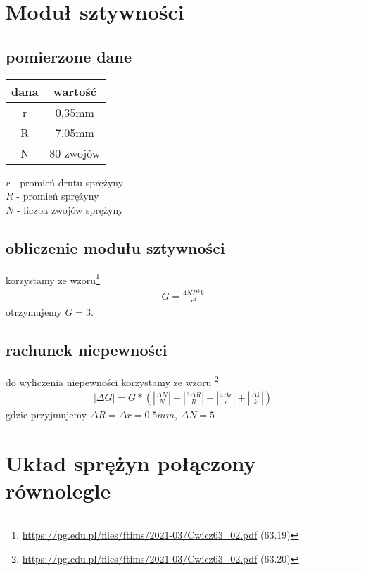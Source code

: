 \documentclass{article}
\begin{document}
\section{Moduł sztywności}
\subsection{pomierzone dane}
\begin{center}
\begin{tabular}{ c | c  }
dana & wartość\\
\hline
 r & 0,35mm \\
 R & 7,05mm \\ 
 N & 80 zwojów \\ 

\end{tabular}
\end{center}
$r$ - promień drutu sprężyny \\
$R$ - promień sprężyny \\
$N$ - liczba zwojów sprężyny

\subsection{obliczenie modułu sztywności}
korzystamy ze wzoru\footnote{\url{https://pg.edu.pl/files/ftims/2021-03/Cwicz63_02.pdf} (63.19)}
\begin{gather*}
	G =  \frac{4NR^3k}{r^4}
\end{gather*} 
otrzymujemy $G = 3.$

\subsection{rachunek niepewności}
do wyliczenia niepewności korzystamy ze wzoru \footnote{\url{https://pg.edu.pl/files/ftims/2021-03/Cwicz63_02.pdf} (63.20)}
\begin{gather*}
	|\Delta G| = G*(|\frac{\Delta N}{N}| + |\frac{3\Delta R}{R}| + |\frac{4\Delta r}{r}| + |\frac{\Delta k}{k}|  )
\end{gather*}
gdzie przyjmujemy $\Delta R = \Delta r = 0.5mm$, $\Delta N = 5$

\section{Układ sprężyn połączony równolegle}
\end{document}
